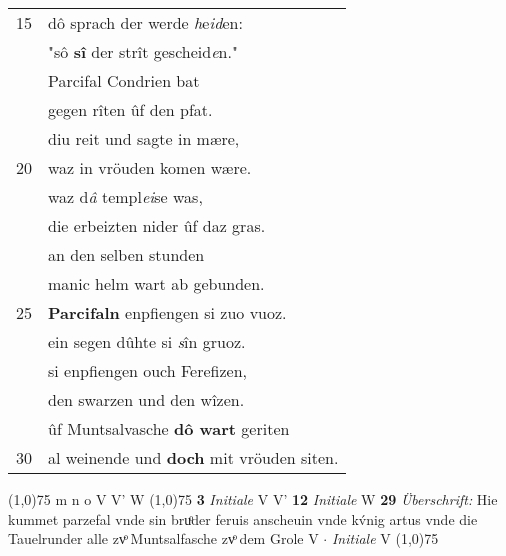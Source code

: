 \documentclass[8pt,a4paper,notitlepage]{article}
\begin{document}
\begin{table}[ht]
\begin{minipage}[t]{0.5\linewidth}
\begin{tabular}{rl}
15 & dô sprach der werde \textit{h}e\textit{id}en:\\ 
 & "sô \textbf{sî} der strît gescheid\textit{e}n."\\ 
 & Parcifal Condrien bat\\ 
 & gegen rîten ûf den pfat.\\ 
 & diu reit und sagte in mære,\\ 
20 & waz in vröuden komen wære.\\ 
 & waz d\textit{â} templ\textit{ei}se was,\\ 
 & die erbeizten nider ûf daz gras.\\ 
 & an den selben stunden\\ 
 & manic helm wart ab gebunden.\\ 
25 & \textbf{Parcifaln} enpfiengen si zuo vuoz.\\ 
 & ein segen dûhte si \textit{s}în gruoz.\\ 
 & si enpfiengen ouch Ferefizen,\\ 
 & den swarzen und den wîzen.\\ 
 & ûf Muntsalvasche \textbf{dô wart} geriten\\ 
30 & al weinende und \textbf{doch} mit vröuden siten.\\ 
\end{tabular}
\scriptsize
\line(1,0){75} \newline
m n o V V' W \newline
\line(1,0){75} \newline
\textbf{3} \textit{Initiale} V V'  \textbf{12} \textit{Initiale} W  \textbf{29} \textit{Überschrift:} Hie kummet parzefal vnde sin bruͦder feruis anscheuin vnde kv́nig artus vnde die Tauelrunder alle zvͦ Muntsalfasche zvͦ dem Grole V   $\cdot$ \textit{Initiale} V  \newline
\line(1,0){75} \newline

\end{minipage}
\end{table}
\end{document}
